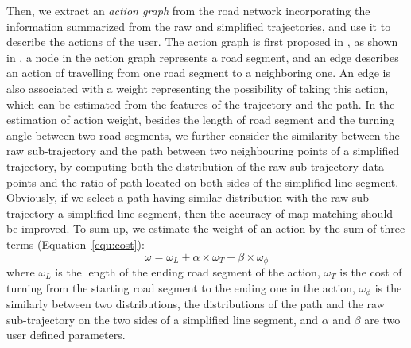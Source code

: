 Then, we extract an \emph{\emph{action graph}} from the road network incorporating the information summarized from the raw and simplified trajectories,  and use it to describe the actions of the user.
The action graph is first proposed in \cite{Osogami:2013:IRL}, as shown in , a node in the action graph represents  a
road segment, and an edge describes an action of travelling from one road segment to a neighboring one. An edge is also
associated with a weight representing the possibility of taking this action, which can be estimated from the features of the
trajectory and the path.
%
In the estimation of action weight, besides the length of road segment and the turning angle between two road segments, we further consider the similarity between the raw sub-trajectory and the path between two neighbouring points of a simplified trajectory, by computing both the distribution of the raw sub-trajectory data points and the ratio of path located on both sides of the simplified line segment.
%
Obviously, if we select a path having similar distribution with the raw sub-trajectory \wrt a simplified line segment, then the accuracy of map-matching should be improved.
%
To sum up, we estimate the weight of an action by the sum of three terms (Equation~\ref{equ:cost}): %
\begin{equation}
    \omega = \omega_{L} + \alpha \times \omega_{T} + \beta \times \omega_{\phi}
    \label{equ:cost}
\end{equation}
where $\omega_{L}$ is the length of the ending road segment of the action,
$\omega_{T}$ is the cost of turning from the starting road segment to the ending
one in the action, $\omega_{\phi}$ is the similarly
between two distributions, \ie the distributions of the path and the raw sub-trajectory on the two sides of a simplified
line segment, and $\alpha$ and $\beta$ are two user defined parameters.

